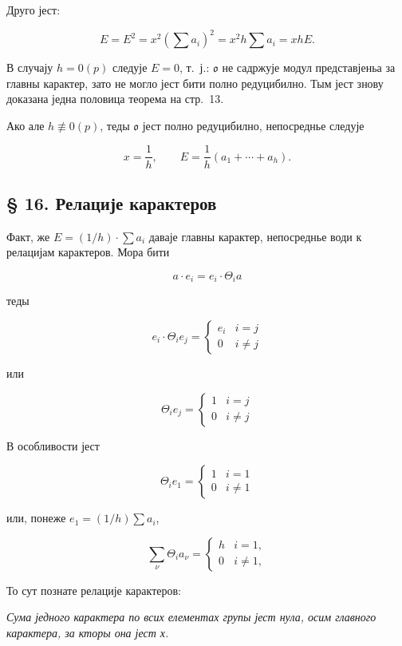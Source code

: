 \documentclass[11pt]{article}
\begin{document}
Друго јест:

\[
E=E^2=x^2\left(\sum a_i\right)^2=x^2h\sum a_i=xhE.
\]

В случају \(h=0(p)\) следује \(E=0\), т.~ј.: \(\mathfrak o\) не садржује модул представјеньа за главны карактер, зато не могло јест бити полно редуцибилно. Тым јест знову доказана једна половица теорема на стр.~13.

Ако але \(h\not\equiv0(p)\), теды \(\mathfrak o\) јест полно редуцибилно, непосреднье следује

\[
x=\frac{1}{h},\qquad E=\frac{1}{h}(a_1+\cdots+a_h).
\]

\subsection*{§ 16. Релације карактеров}\label{die-charakterenrelationen}

Факт, же \(E=(1/h)\cdot\sum a_i\) даваје главны карактер, непосреднье води к релацијам карактеров. Мора бити

\[a \cdot e_i = e_i \cdot \Theta_i a\]

теды

\[e_i \cdot \Theta_i e_j = \begin{cases} e_i & i = j \\ 0 & i \neq j \end{cases}\]

или

\[\Theta_i e_j = \begin{cases} 1 & i = j \\ 0 & i \neq j \end{cases}\]

В особливости јест

\[\Theta_i e_1 = \begin{cases} 1 & i = 1 \\ 0 & i \neq 1 \end{cases}\]

или, понеже \(e_1 = (1/h) \sum a_i\),

\[
\sum_\nu \Theta_i a_\nu=\begin{cases} h & i=1,\\ 0 & i\ne 1, \end{cases}
\]

То сут познате релације карактеров:

\emph{Сума једного карактера по всих елементах групы јест нула, осим главного карактера, за кторы она јест х.}

\end{document}
